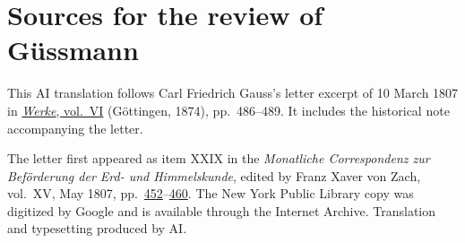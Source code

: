 \clearpage
{}
\section*{Sources for the review of Güssmann}
\noindent This AI translation follows Carl Friedrich Gauss’s letter excerpt of 10 March 1807 in \href{https://gdz.sub.uni-goettingen.de/id/PPN236007467}{\textit{Werke}, vol.~VI} (Göttingen, 1874), pp.~486--489. It includes the historical note accompanying the letter.
\par\smallskip\noindent The letter first appeared as item XXIX in the \textit{Monatliche Correspondenz zur Beförderung der Erd- und Himmelskunde}, edited by Franz Xaver von Zach, vol.~XV, May 1807, pp.~\href{https://archive.org/download/monatlichecorre21zachgoog/page/n469.jpg}{452}--\href{https://archive.org/download/monatlichecorre21zachgoog/page/n477.jpg}{460}. The New York Public Library copy was digitized by Google and is available through the Internet Archive. Translation and typesetting produced by AI.
\clearpage
